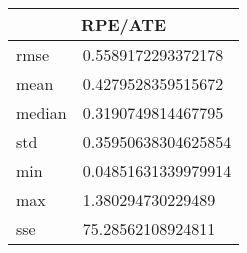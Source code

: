 \begin{table}[!ht] 
 \centering 
 \begin{tabular}{|l|l|} \hline 
 \multicolumn{2}{|c|}{RPE/ATE} \\ \hline 
 rmse & 0.5589172293372178 \\ \hline 
mean & 0.4279528359515672 \\ \hline 
median & 0.3190749814467795 \\ \hline 
std & 0.35950638304625854 \\ \hline 
min & 0.04851631339979914 \\ \hline 
max & 1.380294730229489 \\ \hline 
sse & 75.28562108924811 \\ \hline 
\end{tabular} 
 \end{table}